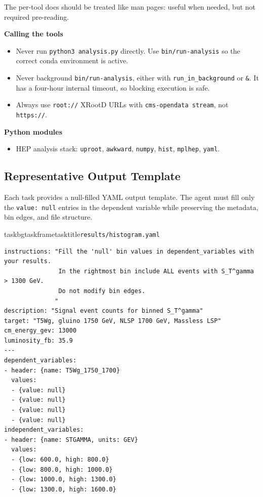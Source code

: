 \documentclass{article}
\begin{document}
\begin{agentcard}
The per-tool docs should be treated like man pages: useful when needed, but not required pre-reading.

\medskip
\textbf{Calling the tools}
\begin{itemize}
    \item Never run \texttt{python3 analysis.py} directly. Use \texttt{bin/run-analysis} so the correct conda environment is active.

    \item Never background \texttt{bin/run-analysis}, either with \texttt{run\_in\_background} or \texttt{\&}. It has a four-hour internal timeout, so blocking execution is safe.

    \item Always use \texttt{root://} XRootD URLs with \texttt{cms-opendata stream}, not \texttt{https://}.
\end{itemize}

\medskip
\textbf{Python modules}
\begin{itemize}
    \item HEP analysis stack: \texttt{uproot}, \texttt{awkward}, \texttt{numpy}, \texttt{hist}, \texttt{mplhep}, \texttt{yaml}.
\end{itemize}
\end{agentcard}


\subsection{Representative Output Template}
\label{app:output-template}

Each task provides a null-filled YAML output template. The agent must fill only the
\texttt{value: null} entries in the dependent variable while preserving the
metadata, bin edges, and file structure.

\begin{filecard}{taskbg}{taskframe}{tasktitle}{\texttt{results/histogram.yaml}}

\begin{lstlisting}[style=yamlplain]
instructions: "Fill the 'null' bin values in dependent_variables with your results.
               In the rightmost bin include ALL events with S_T^gamma > 1300 GeV.
               Do not modify bin edges.
              "
description: "Signal event counts for binned S_T^gamma"
target: "T5Wg, gluino 1750 GeV, NLSP 1700 GeV, Massless LSP"
cm_energy_gev: 13000
luminosity_fb: 35.9
---
dependent_variables:
- header: {name: T5Wg_1750_1700}
  values:
  - {value: null}
  - {value: null}
  - {value: null}
  - {value: null}
independent_variables:
- header: {name: STGAMMA, units: GEV}
  values:
  - {low: 600.0, high: 800.0}
  - {low: 800.0, high: 1000.0}
  - {low: 1000.0, high: 1300.0}
  - {low: 1300.0, high: 1600.0}
\end{lstlisting}

\end{filecard}
\end{document}
